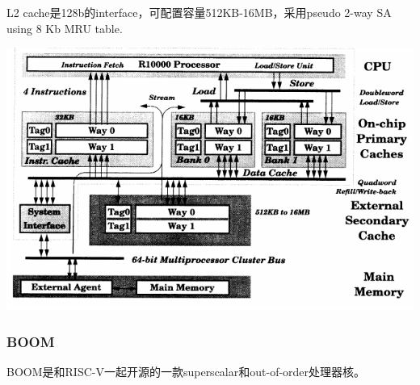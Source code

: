 \documentclass{article}
\newenvironment{commentary}
{ \vspace{-0.1in}
  \begin{quotation}
  \noindent
  \small \em
  \rule{\linewidth}{1pt}\\
}
{
  \end{quotation}
}
\begin{document}
\begin{multicols}{2}
\begin{enumerate}
			L2 cache是128b的interface，可配置容量512KB-16MB，采用pseudo 2-way SA using 8 Kb MRU table.~\cite{mips}
			
			\includegraphics[width=\linewidth]{figs/r10Kmemory.png}
		\end{enumerate}
	\end{multicols}
    \subsubsection{BOOM}
	BOOM是和RISC-V一起开源的一款superscalar和out-of-order处理器核。
	
\end{document}

